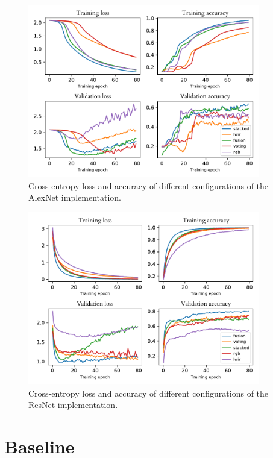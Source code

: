 \documentclass{l4proj}
\begin{document}
\begin{appendices}
\begin{figure}[ht]
  \centering
  \includegraphics[width=0.9\textwidth]{images/evaluation/gridsearch/AlexNet}
  \caption{Cross-entropy loss and accuracy of different configurations of the AlexNet implementation.}
  \label{fig:alexnet_configs}
\end{figure}

\begin{figure}[ht]
  \centering
  \includegraphics[width=0.9\textwidth]{images/evaluation/gridsearch/ResNet}
  \caption{Cross-entropy loss and accuracy of different configurations of the ResNet implementation.}
  \label{fig:resnet_configs_app}
\end{figure}

\chapter{Baseline}
\label{appendix_baseline}


\end{appendices}
\end{document}
